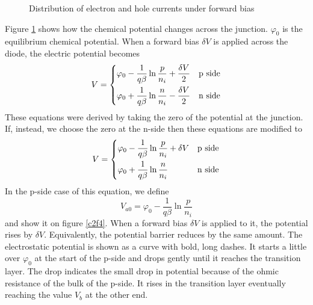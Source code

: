 \begin{figure}[htpb]
\caption{Distribution of electron and hole currents under forward bias}
\label{c2f3}
\end{figure}

Figure \ref{c2f3} shows how the chemical potential changes across the junction.
$\varphi_0$ is the equilibrium chemical potential. When a forward bias $\delta 
V$ is applied across the diode, the electric potential becomes
\begin{equation}\label{c2e79}
V = \begin{dcases} 
 \varphi_0 - \frac{1}{q\beta}\ln\frac{p}{n_i} + \frac{\delta V}
    {2}& \text{p side} \\
 \varphi_0 + \frac{1}{q\beta}\ln\frac{n}{n_i} - \frac{\delta V}{2} & \text{n side}
\end{dcases}
\end{equation}
These equations were derived by taking the zero of the potential at the 
junction. If, instead, we choose the zero at the n-side then these equations
are modified to
\begin{equation}\label{c2e80}
V = \begin{dcases} \varphi_0 - \frac{1}{q\beta}\ln\frac{p}{n_i} + \delta V
    & \text{p side} \\
\varphi_0 + \frac{1}{q\beta}\ln\frac{n}{n_i} & \text{n side}
\end{dcases}
\end{equation}
In the p-side case of this equation, we define
\begin{equation}\label{c2e81}
V_{a0} = \varphi_0 - \frac{1}{q\beta}\ln\frac{p}{n_i}
\end{equation}
and show it on figure \ref{c2f4}. When a forward bias $\delta V$ is applied to
it, the potential rises by $\delta V$. Equivalently, the potential barrier
reduces by the same amount. The electrostatic potential is shown as a curve 
with bold, long dashes. It starts a little over $\varphi_0$ at the start of the
p-side and drops gently until it reaches the transition layer. The drop 
indicates the small drop in potential because of the ohmic resistance of the
bulk of the p-side. It rises in the transition layer eventually reaching the
value $V_b$ at the other end.

